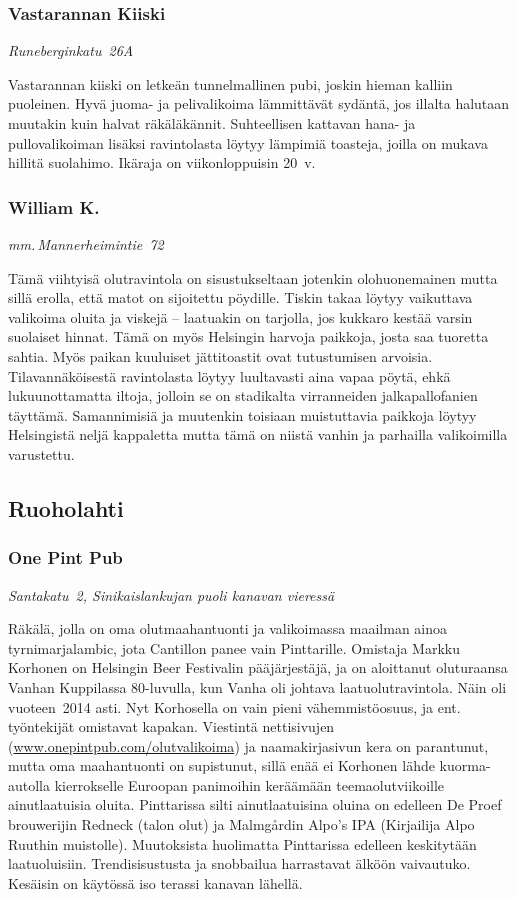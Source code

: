 \documentclass[../ala_hataile.tex]{subfiles}
\begin{document}
\subsubsection*{Vastarannan Kiiski}
\textit{Runeberginkatu~26A}

Vastarannan kiiski on letkeän
tunnelmallinen
pubi, joskin hieman kalliin
puoleinen. Hyvä juoma- ja pelivalikoima
lämmittävät sydäntä, jos illalta halutaan
muutakin kuin halvat räkäläkännit. Suhteellisen
kattavan hana- ja pullovalikoiman
lisäksi ravintolasta löytyy lämpimiä toasteja,
joilla on mukava hillitä suolahimo. Ikäraja
on viikonloppuisin
20~v.

\subsubsection*{William K.}
\textit{mm.\,Mannerheimintie~72}

Tämä viihtyisä olutravintola on sisustukseltaan
jotenkin olohuonemainen mutta
sillä erolla, että matot on sijoitettu pöydille.
Tiskin takaa löytyy vaikuttava valikoima
oluita ja viskejä -- laatuakin on tarjolla,
jos kukkaro kestää varsin suolaiset hinnat. Tämä on myös Helsingin harvoja paikkoja, josta saa tuoretta sahtia.
Myös paikan kuuluiset jättitoastit ovat tutustumisen
arvoisia. Tilavannäköisestä
ravintolasta löytyy luultavasti aina vapaa
pöytä, ehkä lukuunottamatta iltoja, jolloin
se on stadikalta virranneiden jalkapallofanien
täyttämä. Samannimisiä ja muutenkin
toisiaan muistuttavia paikkoja löytyy
Helsingistä neljä kappaletta mutta tämä on
niistä vanhin ja parhailla valikoimilla varustettu.
\subsection*{Ruoholahti}
\subsubsection*{One Pint Pub}
\textit{Santakatu~2, Sinikaislankujan puoli kanavan
vieressä}

Räkälä, jolla on oma olutmaahantuonti
ja valikoimassa maailman ainoa tyrnimarjalambic,
jota Cantillon panee vain Pinttarille.
Omistaja Markku Korhonen on Helsingin
Beer Festivalin pääjärjestäjä, ja on
aloittanut oluturaansa Vanhan Kuppilassa
80-luvulla, kun Vanha oli johtava laatuolutravintola.
Näin oli vuoteen~2014 asti. Nyt
Korhosella on vain pieni vähemmistöosuus,
ja ent.\,työntekijät omistavat kapakan.
Viestintä nettisivujen (\url{www.onepintpub.com/olutvalikoima}) ja naamakirjasivun kera
on parantunut, mutta oma maahantuonti
on supistunut, sillä enää ei Korhonen lähde
kuorma-autolla kierrokselle Euroopan
panimoihin keräämään teemaolutviikoille
ainutlaatuisia oluita. Pinttarissa silti ainutlaatuisina
oluina on edelleen De Proef
brouwerijin Redneck (talon olut) ja
Malmgårdin Alpo's IPA (Kirjailija Alpo
Ruuthin muistolle).
Muutoksista huolimatta Pinttarissa edelleen
keskitytään laatuoluisiin. Trendisisustusta
ja snobbailua harrastavat älköön vaivautuko.
Kesäisin on käytössä iso terassi
kanavan lähellä.
\end{document}

